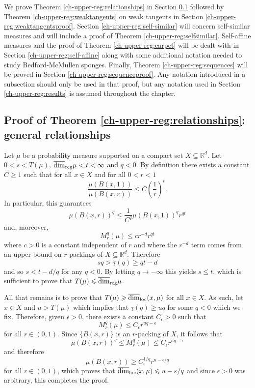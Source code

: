 We prove Theorem \ref{ch-upper-reg:relationships} in Section \ref{ch-upper-reg:spectrumproof} followed by Theorem \ref{ch-upper-reg:weaktangents} on weak tangents in Section \ref{ch-upper-reg:weaktangentsproof}. Section \ref{ch-upper-reg:self-similar} will concern self-similar measures and will include a proof of Theorem \ref{ch-upper-reg:selfsimilar}. Self-affine measures and the proof of Theorem \ref{ch-upper-reg:carpet} will be dealt with in Section \ref{ch-upper-reg:self-affine} along with some additional notation needed to study Bedford-McMullen sponges. Finally, Theorem \ref{ch-upper-reg:sequences} will be proved in Section \ref{ch-upper-reg:sequenceproof}. Any notation introduced in a subsection should only be used in that proof, but any notation used in Section \ref{ch-upper-reg:results} is assumed throughout the chapter.




\subsection{Proof of Theorem \ref{ch-upper-reg:relationships}: general relationships}\label{ch-upper-reg:spectrumproof}

Let $\mu$ be a probability measure supported on a compact set $X \subseteq \mathbb{R}^d$. Let $0<s< T(\mu)$,  $\overline{\dim}_{\textup{reg}} \mu < t < \infty$ and $q<0$. By definition there exists a  constant  $C \geq 1$ such that for all $x\in X$ and for all $0<r< 1$
\[
\frac{\mu(B(x,1))}{\mu(B(x,r))} \le C \left(\frac{1}{r} \right)^t.
\]
In particular, this guarantees 
\[
\mu(B(x,r))^q \le \frac{1}{C^q}\mu(B(x,1))^q  r^{qt}
\]
and, moreover, 
\[
M_r^q(\mu) \leq c r^{-d}r^{qt}
\]
where $c>0$ is a constant independent of  $r$ and where the $r^{-d}$ term comes from an upper bound on $r$-packings of $X \subseteq \mathbb{R}^d$.  Therefore 
\[
sq > \underline{\tau}(q)   \ge  qt-d
\]
and so $s<t-d/q$ for any $q<0$. By letting $q \rightarrow - \infty$ this yields $s \le t$, which is sufficient to prove that $T(\mu) \leqslant \overline{\dim}_{\textup{reg}} \mu$.

All that remains is to prove that $T(\mu) \geqslant \overline{\dim}_{\textup{loc}}(x,\mu)$ for all $x \in X$.  As such, let $x \in X$ and $u>T(\mu)$ which implies that $\underline{\tau}(q)  \geq  uq$ for some $q<0$ which we fix.  Therefore, given $\epsilon>0$, there exists a constant $C_\epsilon>0$ such that
\[
M_r^q(\mu) \leq C_\epsilon r^{uq-\epsilon}
\]
for all $r \in (0,1)$.  Since $\{ B(x,r)\}$ is an $r$-packing of $X$, it follows that
\[
\mu(B(x,r))^q \le M_r^q(\mu) \leq C_\epsilon r^{uq-\epsilon}
\]
and therefore
\[
\mu(B(x,r)) \ge  C_\epsilon^{1/q} r^{u-\epsilon/q}
\]
for all $r\in (0,1)$, which proves that $\overline{\dim}_{\textup{loc}}(x,\mu) \leqslant u-\varepsilon/q$ and since $\epsilon>0$ was arbitrary, this completes the proof.



